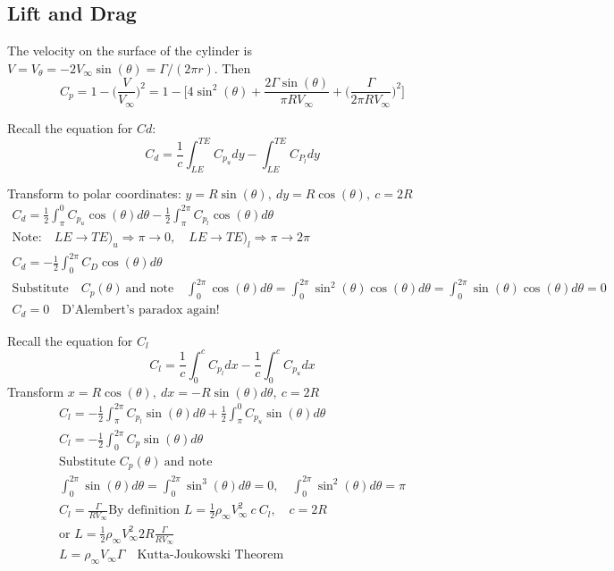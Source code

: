 \documentclass[draft=false, titlepage]{article}
\begin{document}
 
 \subsection{Lift and Drag}
 The velocity on the surface of the cylinder is $V=V_\theta = -2V_\infty \sin(\theta) = \Gamma/(2\pi r)$. Then
 \begin{equation*}
     C_p = 1-\big( \frac{V}{V_\infty} \big)^2 = 1-\Big[ 4\sin^2(\theta) + \frac{2\Gamma \sin(\theta)}{\pi RV_\infty} + \big(\frac{\Gamma}{2\pi RV_\infty}\Big)^2 \Big]
 \end{equation*}

 Recall the equation for $Cd$:
 \begin{equation*}
     C_d = \frac{1}{c} \int_{LE}^{TE} C_{p_u} dy - \int_{LE}^{TE}C_{P_l}dy
 \end{equation*}

 Transform to polar coordinates: $y = R\sin(\theta),\ dy = R\cos(\theta),\ c=2R$
 \begin{gather*}
 C_d = \frac{1}{2} \int_\pi ^0 C_{p_u} \cos(\theta) d\theta - \frac{1}{2}\int_\pi^{2\pi}C_{p_l}\cos(\theta)d\theta\\
 \text{Note:}\quad LE \rightarrow TE\big)_u \Longrightarrow \pi \rightarrow 0,\quad LE \rightarrow TE\big)_l\Longrightarrow \pi \rightarrow 2\pi\\
 C_d = -\frac{1}{2}\int_0^{2\pi} C_D \cos(\theta) d\theta\\
 \text{Substitute} \quad C_p(\theta)\ \text{and note}\quad
 \int_0^{2\pi}\cos(\theta)d\theta = \int_0^{2\pi} \sin^2(\theta) \cos(\theta)d\theta = \int_0^{2\pi}\sin(\theta)\cos(\theta)d\theta = 0\\
 \boxed{C_d = 0} \quad \text{D'Alembert's paradox again!}
\end{gather*}

Recall the equation for $C_l$
\begin{equation*}
    C_l = \frac{1}{c} \int_0^c C_{p_l} dx - \frac{1}{c} \int_0^c C_{p_u} dx
\end{equation*}
Transform $x=R\cos(\theta),\ dx = -R\sin(\theta)d\theta,\ c=2R$
\begin{gather*}
    C_l = -\frac{1}{2} \int_\pi^{2\pi}C_{p_l}\sin(\theta)d\theta + \frac{1}{2} \int_\pi^0 C_{p_u}\sin(\theta)d\theta\\
    C_l = -\frac{1}{2}\int_0^{2\pi} C_p\sin(\theta)d\theta\\
    \text{Substitute } C_p(\theta)\ \text{and note}\\
    \int_0^{2\pi}\sin(\theta)d\theta = \int_0^{2\pi}\sin^3(\theta)d\theta = 0,\quad \int_0^{2\pi}\sin^2(\theta)d\theta = \pi\\
    C_l = \frac{\Gamma}{R V_\infty}
    \text{By definition } L = \frac{1}{2}\rho_\infty V_\infty^2\ c\ C_l, \quad c=2R\\
    \text{or } L = \frac{1}{2}\rho_\infty V_\infty^2 2R\frac{\Gamma}{R V_\infty}\\
    \boxed{L=\rho_\infty V_\infty \Gamma} \quad \text{Kutta-Joukowski Theorem}
\end{gather*}
\end{document}
